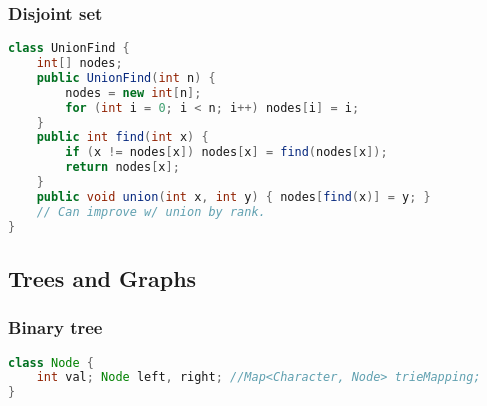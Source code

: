 \documentclass[10pt]{article}
\begin{document}
\subsubsection{Disjoint set}
\begin{lstlisting}[language=java]
class UnionFind {
    int[] nodes;
    public UnionFind(int n) {
        nodes = new int[n];
        for (int i = 0; i < n; i++) nodes[i] = i;
    }
    public int find(int x) {
        if (x != nodes[x]) nodes[x] = find(nodes[x]);
        return nodes[x];
    }
    public void union(int x, int y) { nodes[find(x)] = y; }
    // Can improve w/ union by rank.
}
\end{lstlisting}
\begin{comment}
int parentX = find(x);
        int parentY = find(y);
        // Union by rank
        if (rank[parentX] > rank[parentY]) {
            nodes[parentY] = parentX;
        } else if (rank[parentY] > rank[parentX]) {
            nodes[parentX] = parentY;
        } else {
            nodes[parentX] = parentY;
            rank[parentY]++;
        }
\end{comment}{}


\subsection{Trees and Graphs}
\subsubsection{Binary tree}
\begin{lstlisting}[language=java]
class Node {
    int val; Node left, right; //Map<Character, Node> trieMapping;
}
\end{lstlisting}
\begin{comment}
\begin{lstlisting}[language=java]
BinaryNode(int val) { this.val = val; }
static void traverse(Node root) {
    //Preorder
    if (root.left != null) traverse(root.left);
    // Inorder
    if (root.right != null) traverse(root.right);
    // Postorder
}
\end{lstlisting}

\subsubsection{N-nary tree}
Use array instead of left and right from above, or use an adjacency list graph.
\end{comment}
\end{document}
